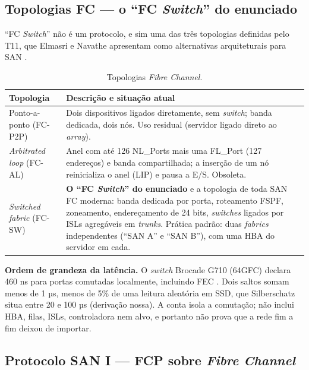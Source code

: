 \documentclass[11pt,a4paper]{article}
\begin{document}
\subsection{Topologias FC --- o ``FC \textit{Switch}'' do enunciado}
\label{sec:topologias}

``FC \textit{Switch}'' não é um protocolo, e sim uma das três topologias definidas pelo T11, que Elmasri e
Navathe apresentam como alternativas arquiteturais para SAN \cite{elmasri2018}.

\begin{table}[H]
\centering
\caption{Topologias \textit{Fibre Channel}.}
\label{tab:topologias}
{\footnotesize
\begin{tabular}{@{}L{3.0cm}L{11.8cm}@{}}
\toprule
\textbf{Topologia} & \textbf{Descrição e situação atual} \\
\midrule
Ponto-a-ponto (FC-P2P) & Dois dispositivos ligados diretamente, sem \textit{switch}; banda dedicada, dois nós. Uso residual (servidor ligado direto ao \textit{array}). \\
\textit{Arbitrated loop} (FC-AL) & Anel com até 126 NL\_Ports mais uma FL\_Port (127 endereços) e banda compartilhada; a inserção de um nó reinicializa o anel (LIP) e pausa a E/S. Obsoleta. \\
\textit{Switched fabric} (FC-SW) & \textbf{O ``FC \textit{Switch}'' do enunciado} e a topologia de toda SAN FC moderna: banda dedicada por porta, roteamento FSPF, zoneamento, endereçamento de 24 bits, \textit{switches} ligados por ISLs agregáveis em \textit{trunks}. Prática padrão: duas \textit{fabrics} independentes (``SAN A'' e ``SAN B''), com uma HBA do servidor em cada. \\
\bottomrule
\end{tabular}}
\end{table}

\textbf{Ordem de grandeza da latência.} O \textit{switch} Brocade G710 (64GFC) declara 460 ns para
portas comutadas localmente, incluindo FEC \cite{brocadeg710}. Dois saltos somam menos de 1 µs, menos de
5\% de uma leitura aleatória em SSD, que Silberschatz situa entre 20 e 100 µs \cite{silberschatz2020}
(derivação nossa). A conta isola a comutação; não inclui HBA, filas, ISLs, controladora nem alvo, e
portanto não prova que a rede fim a fim deixou de importar.

\subsection{Protocolo SAN I --- FCP sobre \textit{Fibre Channel}}
\label{sec:fcp}
\end{document}
